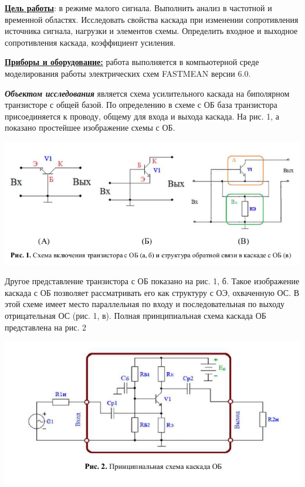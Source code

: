 \documentclass[a4paper,14pt]{extarticle}
\begin{document}
    \begin{singlespace}
        \textbf{\underline{Цель работы}}: в режиме малого сигнала. Выполнить анализ в частотной и
        временной областях. Исследовать свойства каскада при изменении
        сопротивления источника сигнала, нагрузки и элементов схемы. Определить
        входное и выходное сопротивления каскада, коэффициент усиления.
    
    \textbf{\underline{Приборы и оборудование:}} работа выполняется в компьютерной среде
    моделирования работы электрических схем FASTMEAN версии 6.0.

    \textbf{\emph{Объектом исследования}} является схема усилительного каскада на
    биполярном транзисторе с общей базой. По определению в схеме с ОБ база
    транзистора присоединяется к проводу, общему для входа и выхода каскада. На
    рис. 1, а показано простейшее изображение схемы с ОБ.

    \begin{center}
        \includegraphics[scale=0.7]{0.1.png}
    \end{center}
    \vspace{-1cm}

    Другое представление транзистора с ОБ показано на рис. 1, б. Такое
    изображение каскада с ОБ позволяет рассматривать его как структуру с ОЭ,
    охваченную ОС. В этой схеме имеет место параллельная по входу и
    последовательная по выходу отрицательная ОС (рис. 1, в). Полная
    принципиальная схема каскада ОБ представлена на рис. 2

    \begin{center}
        \includegraphics[scale=0.7]{0.2}
    \end{center}
    \vspace{-1cm}


\end{singlespace}
\end{document}
